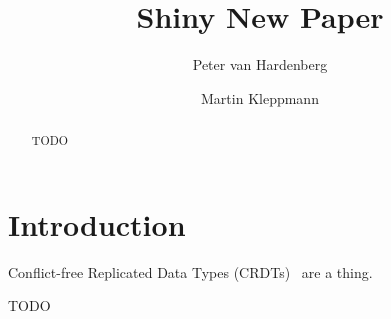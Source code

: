 \documentclass[sigplan,review]{acmart}
\begin{document}
\title{Shiny New Paper}
\author{Peter van Hardenberg}

\author{Martin Kleppmann}

\begin{abstract}
TODO
\end{abstract}

\maketitle

\section{Introduction}

Conflict-free Replicated Data Types (CRDTs)~\cite{Shapiro:2011} are a thing.

\begin{acks}
TODO
\end{acks}



\end{document}
